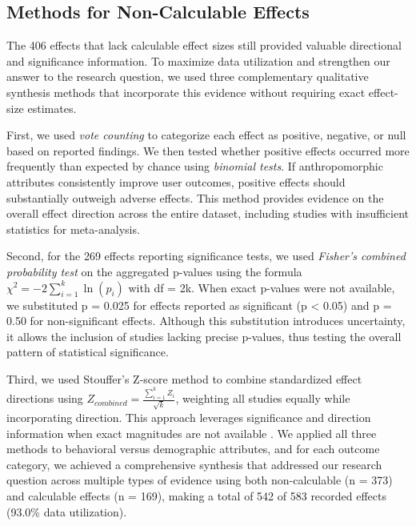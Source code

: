 \documentclass[sigconf,review,anonymous]{acmart}
\begin{document}
\subsection{Methods for Non-Calculable Effects}

The 406 effects that lack calculable effect sizes still provided valuable directional and significance information. To maximize data utilization and strengthen our answer to the research question, we used three complementary qualitative synthesis methods that incorporate this evidence without requiring exact effect-size estimates.

First, we used \textit{vote counting} to categorize each effect as positive, negative, or null based on reported findings. We then tested whether positive effects occurred more frequently than expected by chance using \textit{binomial tests}. If anthropomorphic attributes consistently improve user outcomes, positive effects should substantially outweigh adverse effects. This method provides evidence on the overall effect direction across the entire dataset, including studies with insufficient statistics for meta-analysis. 

Second, for the 269 effects reporting significance tests, we used \textit{Fisher's combined probability test} \cite{fisher1932statistical} on the aggregated p-values using the formula $\chi^2 = -2\sum_{i=1}^{k} \ln(p_i)$ with df = 2k. When exact p-values were not available, we substituted p = 0.025 for effects reported as significant (p < 0.05) and p = 0.50 for non-significant effects. Although this substitution introduces uncertainty, it allows the inclusion of studies lacking precise p-values, thus testing the overall pattern of statistical significance. %

Third, we used Stouffer's Z-score method \cite{whitlock2005combining} to combine standardized effect directions using $Z_{combined} = \frac{\sum_{i=1}^{k} Z_i}{\sqrt{k}}$, weighting all studies equally while incorporating direction. This approach leverages significance and direction information when exact magnitudes are not available \cite{whitlock2005combining}.
We applied all three methods to behavioral versus demographic attributes, and for each outcome category, we achieved a comprehensive synthesis that addressed our research question across multiple types of evidence using both  %
non-calculable (n = 373) and calculable effects (n = 169), making a total of 542 of 583 recorded effects (93.0\% data utilization). 
\end{document}
